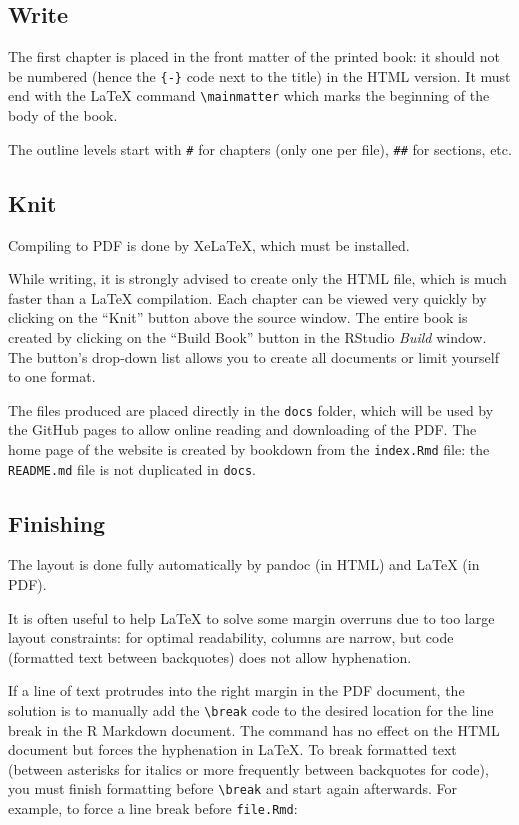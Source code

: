 \documentclass[
  12pt,
  american,
  a4paper,
  extrafontsizes,onecolumn,openright
  ]{memoir}
\begin{document}
\subsection{Write}\label{write-1}

The first chapter is placed in the front matter of the printed book: it should not be numbered (hence the \texttt{\{-\}} code next to the title) in the HTML version.
It must end with the LaTeX command \texttt{\textbackslash{}mainmatter} which marks the beginning of the body of the book.

The outline levels start with \texttt{\#} for chapters (only one per file), \texttt{\#\#} for sections, etc.

\subsection{Knit}\label{knit-1}

Compiling to PDF is done by XeLaTeX, which must be installed.

While writing, it is strongly advised to create only the HTML file, which is much faster than a LaTeX compilation.
Each chapter can be viewed very quickly by clicking on the \enquote{Knit} button above the source window.
The entire book is created by clicking on the \enquote{Build Book} button in the RStudio \emph{Build} window.
The button's drop-down list allows you to create all documents or limit yourself to one format.

The files produced are placed directly in the \texttt{docs} folder, which will be used by the GitHub pages to allow online reading and downloading of the PDF.
The home page of the website is created by bookdown from the \texttt{index.Rmd} file: the \texttt{README.md} file is not duplicated in \texttt{docs}.

\subsection{Finishing}\label{finishing}

The layout is done fully automatically by pandoc (in HTML) and LaTeX (in PDF).

It is often useful to help LaTeX to solve some margin overruns due to too large layout constraints: for optimal readability, columns are narrow, but code (formatted text between backquotes) does not allow hyphenation.

If a line of text protrudes into the right margin in the PDF document, the solution is to manually add the \texttt{\textbackslash{}break} code to the desired location for the line break in the R Markdown document.
The command has no effect on the HTML document but forces the hyphenation in LaTeX.
To break formatted text (between asterisks for italics or more frequently between backquotes for code), you must finish formatting before \texttt{\textbackslash{}break} and start again afterwards.
For example, to force a line break before \texttt{file.Rmd}:
\end{document}

